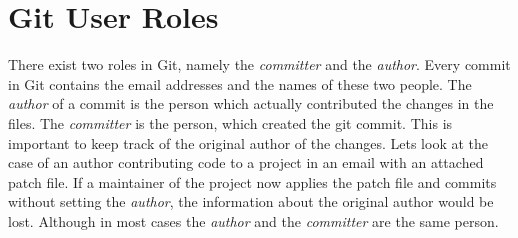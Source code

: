 \section{Git User Roles}
There exist two roles in Git, namely the \emph{committer} and the \emph{author}.
Every commit in Git contains the email addresses and the names of these two people.
The \emph{author} of a commit is the person which actually contributed the changes in the files.
The \emph{committer} is the person, which created the git commit.
This is important to keep track of the original author of the changes.
Lets look at the case of an author contributing code to a project in an email with an attached patch file.
If a maintainer of the project now applies the patch file and commits without setting the \emph{author}, the information about the original author would be lost.
Although in most cases the \emph{author} and the \emph{committer} are the same person. 
